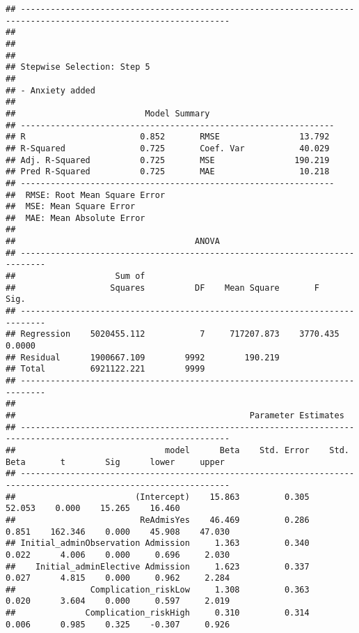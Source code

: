 \documentclass[
]{article}
\begin{document}
\begin{verbatim}
## ----------------------------------------------------------------------------------------------------------------
## 
## 
## 
## Stepwise Selection: Step 5 
## 
## - Anxiety added 
## 
##                          Model Summary                          
## ---------------------------------------------------------------
## R                       0.852       RMSE                13.792 
## R-Squared               0.725       Coef. Var           40.029 
## Adj. R-Squared          0.725       MSE                190.219 
## Pred R-Squared          0.725       MAE                 10.218 
## ---------------------------------------------------------------
##  RMSE: Root Mean Square Error 
##  MSE: Mean Square Error 
##  MAE: Mean Absolute Error 
## 
##                                    ANOVA                                    
## ---------------------------------------------------------------------------
##                    Sum of                                                  
##                   Squares          DF    Mean Square       F          Sig. 
## ---------------------------------------------------------------------------
## Regression    5020455.112           7     717207.873    3770.435    0.0000 
## Residual      1900667.109        9992        190.219                       
## Total         6921122.221        9999                                      
## ---------------------------------------------------------------------------
## 
##                                               Parameter Estimates                                                
## ----------------------------------------------------------------------------------------------------------------
##                              model      Beta    Std. Error    Std. Beta       t        Sig      lower     upper 
## ----------------------------------------------------------------------------------------------------------------
##                        (Intercept)    15.863         0.305                  52.053    0.000    15.265    16.460 
##                         ReAdmisYes    46.469         0.286        0.851    162.346    0.000    45.908    47.030 
## Initial_adminObservation Admission     1.363         0.340        0.022      4.006    0.000     0.696     2.030 
##    Initial_adminElective Admission     1.623         0.337        0.027      4.815    0.000     0.962     2.284 
##               Complication_riskLow     1.308         0.363        0.020      3.604    0.000     0.597     2.019 
##              Complication_riskHigh     0.310         0.314        0.006      0.985    0.325    -0.307     0.926 

\end{verbatim}
\end{document}
